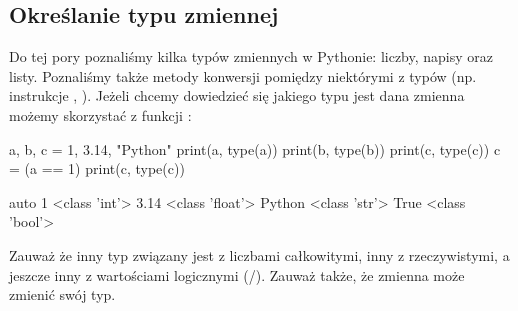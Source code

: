 % 
% 
% 
% 

\subsection{Określanie typu zmiennej}

Do tej pory poznaliśmy kilka typów zmiennych w Pythonie: liczby, napisy oraz listy.
Poznaliśmy także metody konwersji pomiędzy niektórymi z typów (np. instrukcje , ).
Jeżeli chcemy dowiedzieć się jakiego typu jest dana zmienna możemy skorzystać z funkcji :

\begin{CodeFrame}[python]{0.50\textwidth}
a, b, c = 1, 3.14, "Python"
print(a, type(a))
print(b, type(b))
print(c, type(c))
c = (a == 1)
print(c, type(c))
\end{CodeFrame}
\begin{CodeFrame}{auto}
1 <class 'int'>
3.14 <class 'float'>
Python <class 'str'>
True <class 'bool'>
\end{CodeFrame}

Zauważ że inny typ związany jest z liczbami całkowitymi, inny z rzeczywistymi, a jeszcze inny z wartościami logicznymi (/). Zauważ także, że zmienna może zmienić swój typ.

